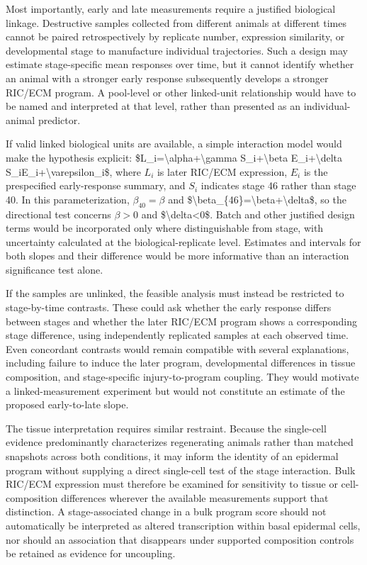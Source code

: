 \documentclass[11pt]{article}
\begin{document}
Most importantly, early and late measurements require a justified biological linkage. Destructive samples collected from different animals at different times cannot be paired retrospectively by replicate number, expression similarity, or developmental stage to manufacture individual trajectories. Such a design may estimate stage-specific mean responses over time, but it cannot identify whether an animal with a stronger early response subsequently develops a stronger RIC/ECM program. A pool-level or other linked-unit relationship would have to be named and interpreted at that level, rather than presented as an individual-animal predictor.

If valid linked biological units are available, a simple interaction model would make the hypothesis explicit: \$L\_i=\textbackslash{}alpha+\textbackslash{}gamma S\_i+\textbackslash{}beta E\_i+\textbackslash{}delta S\_iE\_i+\textbackslash{}varepsilon\_i\$, where $L_i$ is later RIC/ECM expression, $E_i$ is the prespecified early-response summary, and $S_i$ indicates stage 46 rather than stage 40. In this parameterization, $\beta_{40}=\beta$ and \$\textbackslash{}beta\_\{46\}=\textbackslash{}beta+\textbackslash{}delta\$, so the directional test concerns $\beta>0$ and \$\textbackslash{}delta\textless{}0\$. Batch and other justified design terms would be incorporated only where distinguishable from stage, with uncertainty calculated at the biological-replicate level. Estimates and intervals for both slopes and their difference would be more informative than an interaction significance test alone.

If the samples are unlinked, the feasible analysis must instead be restricted to stage-by-time contrasts. These could ask whether the early response differs between stages and whether the later RIC/ECM program shows a corresponding stage difference, using independently replicated samples at each observed time. Even concordant contrasts would remain compatible with several explanations, including failure to induce the later program, developmental differences in tissue composition, and stage-specific injury-to-program coupling. They would motivate a linked-measurement experiment but would not constitute an estimate of the proposed early-to-late slope.

The tissue interpretation requires similar restraint. Because the single-cell evidence predominantly characterizes regenerating animals rather than matched snapshots across both conditions, it may inform the identity of an epidermal program without supplying a direct single-cell test of the stage interaction. Bulk RIC/ECM expression must therefore be examined for sensitivity to tissue or cell-composition differences wherever the available measurements support that distinction. A stage-associated change in a bulk program score should not automatically be interpreted as altered transcription within basal epidermal cells, nor should an association that disappears under supported composition controls be retained as evidence for uncoupling.
\end{document}
